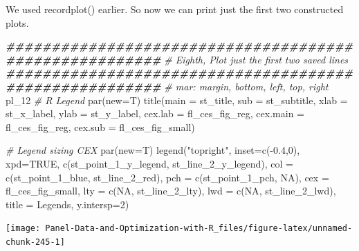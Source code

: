 \documentclass[
]{book}
\newenvironment{Shaded}{\begin{snugshade}}{\end{snugshade}}
\newcommand{\AttributeTok}[1]{\textcolor[rgb]{0.77,0.63,0.00}{#1}}
\newcommand{\CommentTok}[1]{\textcolor[rgb]{0.56,0.35,0.01}{\textit{#1}}}
\newcommand{\ConstantTok}[1]{\textcolor[rgb]{0.00,0.00,0.00}{#1}}
\newcommand{\DecValTok}[1]{\textcolor[rgb]{0.00,0.00,0.81}{#1}}
\newcommand{\DocumentationTok}[1]{\textcolor[rgb]{0.56,0.35,0.01}{\textbf{\textit{#1}}}}
\newcommand{\FloatTok}[1]{\textcolor[rgb]{0.00,0.00,0.81}{#1}}
\newcommand{\FunctionTok}[1]{\textcolor[rgb]{0.00,0.00,0.00}{#1}}
\newcommand{\NormalTok}[1]{#1}
\newcommand{\SpecialCharTok}[1]{\textcolor[rgb]{0.00,0.00,0.00}{#1}}
\newcommand{\StringTok}[1]{\textcolor[rgb]{0.31,0.60,0.02}{#1}}
\begin{document}
We used recordplot() earlier. So now we can print just the first two constructed plots.

\begin{Shaded}
\begin{Highlighting}[]
\DocumentationTok{\#\#\#\#\#\#\#\#\#\#\#\#\#\#\#\#\#\#\#\#\#\#\#\#\#\#\#\#\#\#\#\#\#\#\#\#\#\#\#\#\#\#\#\#\#\#\#\#\#\#\#\#\#\#\#}
\CommentTok{\# Eighth, Plot just the first two saved lines}
\DocumentationTok{\#\#\#\#\#\#\#\#\#\#\#\#\#\#\#\#\#\#\#\#\#\#\#\#\#\#\#\#\#\#\#\#\#\#\#\#\#\#\#\#\#\#\#\#\#\#\#\#\#\#\#\#\#\#\#}
\CommentTok{\# mar: margin, bottom, left, top, right}
\NormalTok{pl\_12}
\CommentTok{\# R Legend}
\FunctionTok{par}\NormalTok{(}\AttributeTok{new=}\NormalTok{T)}
\FunctionTok{title}\NormalTok{(}\AttributeTok{main =}\NormalTok{ st\_title, }\AttributeTok{sub =}\NormalTok{ st\_subtitle, }\AttributeTok{xlab =}\NormalTok{ st\_x\_label, }\AttributeTok{ylab =}\NormalTok{ st\_y\_label,}
      \AttributeTok{cex.lab =}\NormalTok{ fl\_ces\_fig\_reg,}
      \AttributeTok{cex.main =}\NormalTok{ fl\_ces\_fig\_reg,}
      \AttributeTok{cex.sub =}\NormalTok{ fl\_ces\_fig\_small)}

\CommentTok{\# Legend sizing CEX}
\FunctionTok{par}\NormalTok{(}\AttributeTok{new=}\NormalTok{T)}
\FunctionTok{legend}\NormalTok{(}\StringTok{"topright"}\NormalTok{,}
       \AttributeTok{inset=}\FunctionTok{c}\NormalTok{(}\SpecialCharTok{{-}}\FloatTok{0.4}\NormalTok{,}\DecValTok{0}\NormalTok{),}
       \AttributeTok{xpd=}\ConstantTok{TRUE}\NormalTok{,}
       \FunctionTok{c}\NormalTok{(st\_point\_1\_y\_legend, st\_line\_2\_y\_legend),}
       \AttributeTok{col =} \FunctionTok{c}\NormalTok{(st\_point\_1\_blue, st\_line\_2\_red),}
       \AttributeTok{pch =} \FunctionTok{c}\NormalTok{(st\_point\_1\_pch, }\ConstantTok{NA}\NormalTok{),}
       \AttributeTok{cex =}\NormalTok{ fl\_ces\_fig\_small,}
       \AttributeTok{lty =} \FunctionTok{c}\NormalTok{(}\ConstantTok{NA}\NormalTok{, st\_line\_2\_lty),}
       \AttributeTok{lwd =} \FunctionTok{c}\NormalTok{(}\ConstantTok{NA}\NormalTok{, st\_line\_2\_lwd),}
       \AttributeTok{title =} \StringTok{\textquotesingle{}Legends\textquotesingle{}}\NormalTok{,}
       \AttributeTok{y.intersp=}\DecValTok{2}\NormalTok{)}
\end{Highlighting}
\end{Shaded}

\begin{center}\texttt{[image: Panel-Data-and-Optimization-with-R\_files/figure-latex/unnamed-chunk-245-1]} \end{center}
\end{document}
